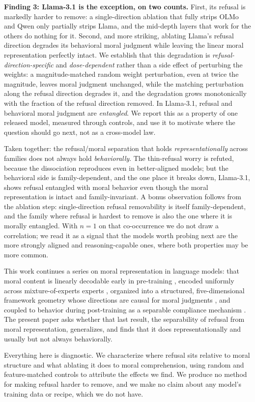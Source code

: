 \textbf{Finding 3: Llama-3.1 is the exception, on two counts.} First, its refusal is
markedly harder to remove: a single-direction ablation that fully strips OLMo and
Qwen only partially strips Llama, and the mid-depth layers that work for the
others do nothing for it. Second, and more striking, ablating Llama's refusal
direction degrades its behavioral moral judgment while leaving the linear moral
representation perfectly intact. We establish that this degradation is
\emph{refusal-direction-specific} and \emph{dose-dependent} rather than a side effect of
perturbing the weights: a magnitude-matched random weight perturbation, even at
twice the magnitude, leaves moral judgment unchanged, while the matching
perturbation along the refusal direction degrades it, and the degradation grows
monotonically with the fraction of the refusal direction removed. In Llama-3.1,
refusal and behavioral moral judgment are \emph{entangled}. We report this as a
property of one released model, measured through controls, and use it to motivate
where the question should go next, not as a cross-model law.

Taken together: the refusal/moral separation that holds \emph{representationally}
across families does not always hold \emph{behaviorally}. The thin-refusal worry is
refuted, because the dissociation reproduces even in better-aligned models;
but the behavioral side is family-dependent, and the one place it breaks down,
Llama-3.1, shows refusal entangled with moral behavior even though the moral
representation is intact and family-invariant. A bonus observation follows from
the ablation step: single-direction refusal removability is itself
family-dependent, and the family where refusal is hardest to remove is also the
one where it is morally entangled. With \(n=1\) on that co-occurrence we do not draw
a correlation; we read it as a signal that the models worth probing next are the
more strongly aligned and reasoning-capable ones, where both properties may be
more common.

This work continues a series on moral representation in language models: that
moral content is linearly decodable early in pre-training
\citep{reblitzrichardson2026fragility}, encoded uniformly across mixture-of-experts
experts \citep{reblitzrichardson2026dilution}, organized into a structured,
five-dimensional framework geometry \citep{reblitzrichardson2026geometry} whose
directions are causal for moral judgments \citep{reblitzrichardson2026causal}, and
coupled to behavior during post-training as a separable compliance mechanism
\citep{reblitzrichardson2026alignment}. The present paper asks whether that last
result, the separability of refusal from moral representation, generalizes, and
finds that it does representationally and usually but not always behaviorally.

Everything here is diagnostic. We characterize where refusal sits relative to
moral structure and what ablating it does to moral comprehension, using random
and feature-matched controls to attribute the effects we find. We produce no
method for making refusal harder to remove, and we make no claim about any
model's training data or recipe, which we do not have.
